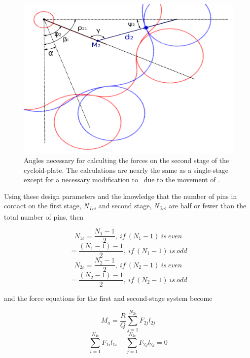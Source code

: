 \begin{figure}[t]
	\centering
	\includegraphics[width=0.8\linewidth]{fig/two_stage_loads_angles_2}
   \caption{Angles necessary for calculting the forces on the second stage of the cycloid-plate. The calculations are nearly the same as a single-stage except for a necessary modification to \textbeta\ due to the movement of \textalpha.}
   \label{fig:two_stage_force_beta}
\end{figure}

Using these design parameters and the knowledge that the number of pins in contact on the first stage, \textit{N\textsubscript{1c}}, and second stage, \textit{N\textsubscript{2c}}, are half or fewer than the total number of pins, then

\begin{equation}
N_{1c} = \frac{N_{1} - 1}{2},\ if\ (N_1 -1)\ is\ even 
\end{equation}
\begin{equation}
= \frac{(N_{1}-1) - 1}{2},\ if\ (N_{1} - 1)\ is\ odd 
\end{equation}
\begin{equation}
N_{2c} = \frac{N_{2}-1}{2},\ if\ (N_{2}-1)\ is\ even 
\end{equation}
\begin{equation}
= \frac{(N_{2}-1) - 1}{2},\ if\ (N_{2}-1)\ is\ odd 
\end{equation}

and the force equations for the first and second-stage system become

\begin{equation} \label{eq:dual_power}
M_a = \frac{R}{Q} \sum_{j=1}^{N_{2c}} F_{2j} l_{2j}
\end{equation}
\begin{equation} \label{eq:dual_torqe}
\sum_{i=1}^{N_{1c}}F_{1i} l_{1i} - \sum_{j=1}^{N_{2c}}F_{2j} l_{2j} = 0
\end{equation}

